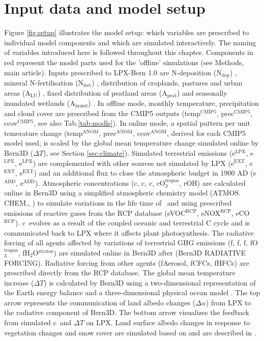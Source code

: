 \section{Input data and model setup}
\label{sec:input}
Figure {\ref{fig:setup}} illustrates the model setup: which variables are prescribed to individual model components and which are simulated interactively. The naming of variables introduced here is followed throughout this chapter. Components in red represent the model parts used for the 'offline' simulations (see Methods, main article). Inputs prescribed to LPX-Bern 1.0 are N-deposition (N$_\mathrm{dep}$) \citep{lamarque11cc}, mineral N-fertilisation (N$_\mathrm{fert}$) \citep{zaehle11ngeo}, distribution of croplands, pastures and urban areas (A$_\mathrm{LU}$) \citep{hurtt06gcb}, fixed distribution of peatland areas (A$_\mathrm{peat}$) \citep{tarnocai09gbc} and seasonally inundated wetlands (A$_\mathrm{inund}$) \citep{prigent07grl}. In offline mode, monthly temperature, precipitation and cloud cover are prescribed from the CMIP5 outputs (temp$^\mathrm{CMIP5}$, prec$^\mathrm{CMIP5}$, ccov$^\mathrm{CMIP5}$, see also Tab.\ref{tab:modls}). In online mode, a spatial pattern per unit temerature change (temp$^\mathrm{ANOM}$, prec$^\mathrm{ANOM}$, ccov$^\mathrm{ANOM}$, derived for each CMIP5 model used, is scaled by the global mean temperature change simulated online by Bern3D ($\Delta T$), see Section \ref{sec:climate}). Simulated terrestrial emissions (e\coo$^\mathrm{LPX}$, e\nno$^\mathrm{LPX}$, e\chh$^\mathrm{LPX}$) are complemented with other sources not simulated by LPX (e\coo$^\mathrm{EXT}$, e\nno$^\mathrm{EXT}$, e\chh$^\mathrm{EXT}$) and an additional flux to close the atmospheric budget in 1900 AD (e\nno$^\mathrm{ADD}$, e\chh$^\mathrm{ADD}$). Atmospheric concentrations (c\coo , c\nno , c\chh , cO$_3^{\mathrm{tropos}}$, rOH) are calculated online in Bern3D using a simplified atmospheric chemistry model (ATMOS. CHEM., \citet{joos01gbc,strassmann09cd}) to simulate variations in the life time of \chh\ and using prescribed emissions of reactive gases from the RCP database (eVOC$^\mathrm{RCP}$, eNOX$^\mathrm{RCP}$, eCO$^\mathrm{RCP}$). c\coo\ evolves as a result of the coupled oceanic and terrestrial C cycle and is communicated back to LPX where it affects plant photosynthesis. The radiative forcing of all agents affected by variations of terrestrial GHG emissions (f\coo , f\nno , f\chh , fO$_3^{\mathrm{tropos}}$, fH$_2$O$^{\mathrm{stratos}}$) are simulated online in Bern3D after \citet{joos01gbc} (Bern3D RADIATIVE FORCING). Radiative forcing from other agents (fAerosol, fCFCs, fHFCs) are prescribed directly from the RCP database. The global mean temperature increase ($\Delta T$) is calculated by Bern3D using a two-dimensional representation of the Earth energy balance \citep{ritz2011a} and a three-dimensional physical ocean model \citep{mueller06}. The top arrow represents the communication of land albedo changes ($\Delta\alpha$) from LPX to the radiative component of Bern3D. The bottom arrow visualizes the feedback from simulated c\coo\ and $\Delta T$ on LPX. Land surface albedo changes in response to vegetation changes and snow cover are simulated based on \citet{otto11cp} and are described in \citet{steinacher11diss}.


